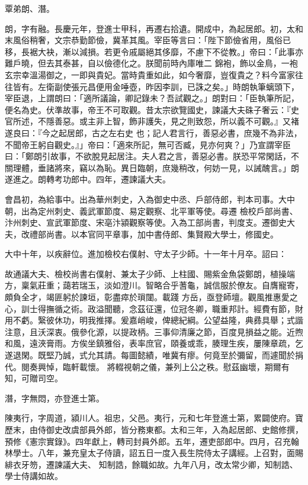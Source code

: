 \begin{pinyinscope}
 覃弟朗、潛。



 朗，字有融。長慶元年，登進士甲科，再遷右拾遺。開成中，為起居郎。初，太和末風俗稍奢，文宗恭勤節儉，冀革其風。宰臣等言曰：「陛下節儉省用，風俗已移，長裾大袂，漸以減損。若更令戚屬絕其侈靡，不慮下不從教。」帝曰：「此事亦難戶曉，但去其泰甚，自以儉德化之。朕聞前時內庫唯二
 錦袍，飾以金鳥，一袍玄宗幸溫湯御之，一即與貴妃。當時貴重如此，如今奢靡，豈復貴之？料今富家往往皆有。左衛副使張元昌便用金唾壺，昨因李訓，已誅之矣。」時朗執筆螭頭下，宰臣退，上謂朗曰：「適所議論，卿記錄未？吾試觀之。」朗對曰：「臣執筆所記，便名為史。伏準故事，帝王不可取觀。昔太宗欲覽國史，諫議大夫硃子奢云：『史官所述，不隱善惡。或主非上智，飾非護失，見之則致怨，所以義不可觀。』又褚遂良曰：『今之起居郎，古之左右史
 也；記人君言行，善惡必書，庶幾不為非法，不聞帝王躬自觀史。』」帝曰：「適來所記，無可否臧，見亦何爽？」乃宣謂宰臣曰：「鄭朗引故事，不欲脫見起居注。夫人君之言，善惡必書。朕恐平常閑話，不關理體，垂諸將來，竊以為恥。異日臨朝，庶幾稍改，何妨一見，以誡醜言。」朗遂進之。朗轉考功郎中。四年，遷諫議大夫。



 會昌初，為給事中。出為華州刺史，入為御史中丞、戶部侍郎，判本司事。大中朝，出為定州刺史、義武軍節度、易定觀察、北平軍等使。尋遷
 檢校戶部尚書、汴州刺史、宣武軍節度、宋亳汴潁觀察等使。入為工部尚書，判度支。遷御史大夫，改禮部尚書。以本官同平章事，加中書侍郎、集賢殿大學士，修國史。



 大中十年，以疾辭位。進加檢校右僕射、守太子少師。十一年十月卒。詔曰：



 故通議大夫、檢校尚書右僕射、兼太子少師、上柱國、賜紫金魚袋鄭朗，植操端方，稟氣莊重；藹若瑞玉，淡如澄川。智略合乎蓍龜，誠信服於僚友。自膺寵寄，頗負全才，竭匪躬於諫垣，彰盡瘁於瑣闥。載踐
 方岳，亟登師壇。觀風推惠愛之心，訓士得撫循之術。政溢聞聽，念茲征還，位冠冬卿，職重邦計。經費有節，財用不虧。繄彼休功，明我推擇。爰嘉峭峻，俾總紀綱。公望益隆，典彞具舉；式諧注意，且沃深衷。俄參化源，以提政柄。三事仰清廉之節，百度見損益之能。近煦和風，遠浹膏雨。方俟坐鎮雅俗，表率庶官，頤養或乖，腠理生疾，屢陳章疏，乞遂退閑。既堅乃誠，式允其請。每圖懿績，唯冀有瘳。何竟至於彌留，而遽聞於捐代。閱奏興悼，臨軒載懷。
 將輟視朝之儀，兼列上公之秩。慰茲幽壞，期爾有知，可贈司空。



 潛，字無悶，亦登進士第。



 陳夷行，字周道，潁川人。祖忠，父邑。夷行，元和七年登進士第，累闢使府。寶歷末，由侍御史改虞部員外郎，皆分務東都。太和三年，入為起居郎、史館修撰，預修《憲宗實錄》。四年獻上，轉司封員外郎。五年，遷吏部郎中。四月，召充翰林學士。八年，兼充皇太子侍讀，詔五日一度入長生院侍太子講經。上召對，面賜緋衣牙笏，遷諫議大夫、
 知制誥，餘職如故。九年八月，改太常少卿，知制誥、學士侍講如故。




\end{pinyinscope}
